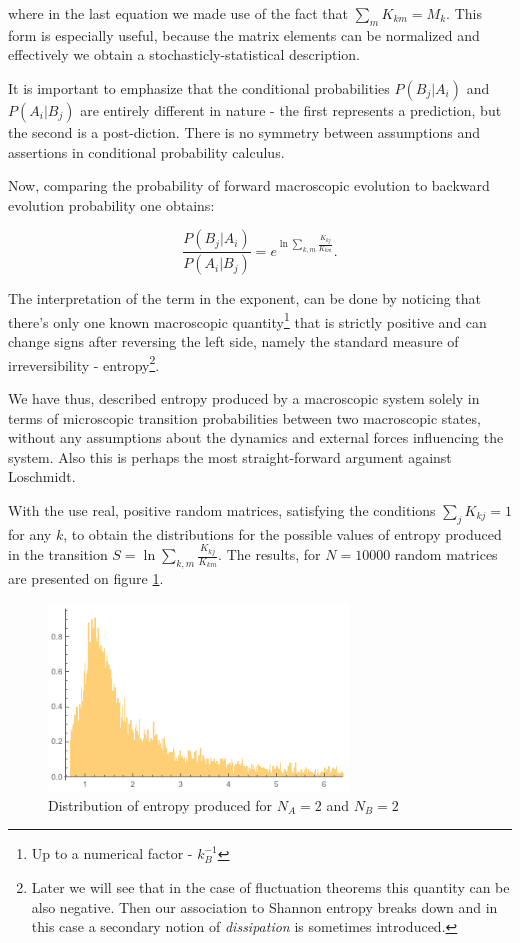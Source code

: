 \documentclass[a4paper,12pt]{article}
\begin{document}
where in the last equation we made use of the fact that $\sum_m K_{km}=M_k $.
This form is especially useful, because the matrix elements can be normalized and effectively we obtain a stochasticly-statistical description.

It is important to emphasize that the conditional probabilities $P(B_j|A_i)$ and $P(A_i|B_j)$ are entirely different in nature - the first represents a prediction, but the second is a post-diction. There is no symmetry between assumptions and assertions in conditional probability calculus.

Now, comparing the probability of forward macroscopic evolution to backward evolution probability one obtains: 

\begin{equation}
\label{MacrostatesPRatio}
  \frac{P(B_j|A_i)}{P(A_i|B_j)}= e^{\ln{\sum_{k,m} \frac{K_{kj}}{K_{km}}}}.
\end{equation}


The interpretation of the term in the exponent, can be done by noticing that there's only one known macroscopic quantity\footnote{Up to a numerical factor - $k_B^{-1}$} that is strictly positive and can change signs after reversing the left side, namely the standard measure of irreversibility - entropy\footnote{Later we will see that in the case of fluctuation theorems this quantity can be also negative. Then our association to Shannon entropy breaks down and in this case a secondary notion of \textit{dissipation} is sometimes introduced.}.

We have thus, described entropy produced by a macroscopic system solely in terms of microscopic transition probabilities between two macroscopic states, without any assumptions about the dynamics and external forces influencing the system. Also this is perhaps the most straight-forward argument against Loschmidt.

With the use real, positive random matrices, satisfying the conditions $\sum_j K_{kj} = 1$ for any $k$, to obtain the distributions for the possible values of entropy produced in the transition $ S = \ln{\sum_{k,m} \frac{K_{kj}}{K_{km}}} $. The results, for $N=10000$ random matrices are presented on figure \ref{Fig4}.

\begin{figure}[ht!]
\centering \includegraphics[width=8cm]{dissipation} \caption{Distribution of entropy produced for $N_A = 2$ and $N_B=2$}
\label{Fig4} 
\end{figure}
\end{document}
